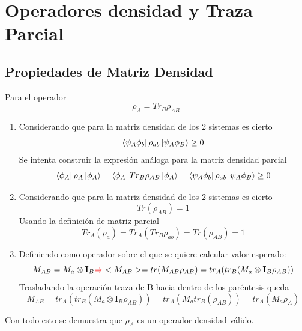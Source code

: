 \documentclass{book}
\begin{document}
\section{Operadores densidad y Traza Parcial}
\subsection{Propiedades de Matriz Densidad} Para el operador
$$ \rho_A=Tr_B\rho_{AB}$$
\begin{enumerate}
    \item Considerando que para la matriz densidad de los 2 sistemas es cierto
    $$ \bra{\psi_A\phi_b}\rho_{ab}\ket{\psi_A\phi_B}\geq 0$$
    Se intenta construir la expresión análoga para la matriz densidad parcial
    $$ \bra{\phi_A}\rho_A\ket{\phi_A}=\bra{\phi_A}Tr_B\rho_{AB}\ket{\phi_A}=\bra{\psi_A\phi_b}\rho_{ab}\ket{\psi_A\phi_B}\geq 0$$
    \item Considerando que para la matriz densidad de los 2 sistemas es cierto
    $$ Tr(\rho_{AB})=1$$ Usando la definición de matriz parcial $$Tr_A(\rho_a)=Tr_A(Tr_B\rho_{ab})= Tr(\rho_{AB})=1$$
    \item Definiendo como operador sobre el que se quiere calcular valor esperado:
    $$ M_{AB}=M_a\otimes\mathbf{I}_B \textcolor{red}{\Rightarrow} <M_{AB}>=tr(M_{AB}\rho_{AB})=tr_A(tr_B(M_a\otimes\mathbf{I}_B\rho_{AB}))$$
    Trasladando la operación traza de B hacia dentro de los paréntesis queda 
    $$M_{AB}=tr_A(tr_B(M_a\otimes\mathbf{I}_B\rho_{AB}))=tr_A(M_a tr_B(\rho_{AB}))=tr_A (M_a\rho_A)$$
\end{enumerate}
Con todo esto se demuestra que $\rho_A$ es un operador densidad válido.
\end{document}
